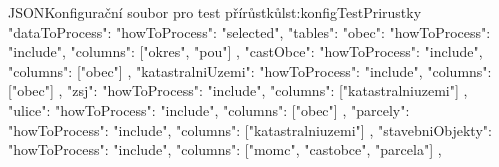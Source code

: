 \begin{code}{JSON}{Konfigurační soubor pro test přírůstků}{lst:konfigTestPrirustky}
  {
    "dataToProcess": {
      "howToProcess": "selected",
      "tables": {
        "obec": {
          "howToProcess": "include",
          "columns": ["okres", "pou"]
        },
        "castObce": {
          "howToProcess": "include",
          "columns": ["obec"]
        },
        "katastralniUzemi": {
          "howToProcess": "include",
          "columns": ["obec"]
        },
        "zsj": {
          "howToProcess": "include",
          "columns": ["katastralniuzemi"]
        },
        "ulice": {
          "howToProcess": "include",
          "columns": ["obec"]
        },
        "parcely": {
          "howToProcess": "include",
          "columns": ["katastralniuzemi"]
        },
        "stavebniObjekty": {
          "howToProcess": "include",
          "columns": ["momc", "castobce", "parcela"]
        },
      }
    }
  }
\end{code}


